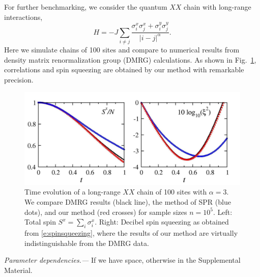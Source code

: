 \documentclass[aps,prl,showpacs,amsmath,amssymb,superscriptaddress,reprint,10pt]{revtex4-1}
\newcommand{\mk}[1]{{\color{michael} #1}}
\begin{document}
For further benchmarking, we consider the quantum $XX$ chain with long-range interactions,
\begin{equation}\label{e:XY}
H=-J\sum_{i\neq j}\frac{\sigma_i^x\sigma_j^x+\sigma_i^y\sigma_j^y}{|i-j|^\alpha}.
\end{equation}
Here we simulate chains of 100 sites and compare to numerical results from density matrix renormalization group (DMRG) calculations. As shown in Fig.~\ref{f:XX}, correlations and spin squeezing are obtained by our method with remarkable precision.

\begin{figure}\centering
\includegraphics[width=\linewidth]{./Jx05Jy05_Schach_N100_alph3_nt100000.jpg}
\caption{\label{f:XX}%
Time evolution of a long-range $XX$ chain of 100 sites with $\alpha=3$. We compare DMRG results (black line), the method of SPR (blue dots), and our method (red crosses) for sample sizes $n=10^5$. Left: Total spin $S^x=\sum_i\sigma_i^x$. Right: Decibel spin squeezing as obtained from \eqref{e:spinsqueezing}, where the results of our method are virtually indistinguishable from the DMRG data.
}%
\end{figure}


{\em Parameter dependencies.---}\mk{If we have space, otherwise in the Supplemental Material.}
\end{document}
